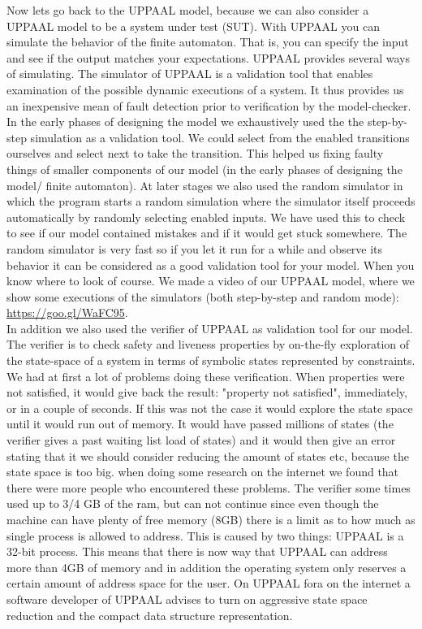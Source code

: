 Now lets go back to the UPPAAL model, because we can also consider a UPPAAL model to be a system under test (SUT). With UPPAAL you can simulate the behavior of the finite automaton. That is, you can specify the input and see if the output matches your expectations. UPPAAL provides several ways of simulating. The simulator of UPPAAL is a validation tool that enables examination of the possible dynamic executions of a system. It thus provides us an inexpensive mean of fault detection prior to verification by the model-checker. In the early phases of designing the model we exhaustively used the the step-by-step simulation as a validation tool. We could select from the enabled transitions ourselves and select next to take the transition. This helped us fixing faulty things of smaller components of our model (in the early phases of designing the model/ finite automaton). At later stages we also used the random simulator in which the program starts a random  simulation where the simulator itself proceeds automatically by randomly selecting enabled inputs. We have used this to check to see if our model contained mistakes and if it would get stuck somewhere. The random simulator is very fast so if you let it run for a while and observe its behavior it can be considered as a good validation tool for your model. When you know where to look of course. We made a video of our UPPAAL model, where we show some executions of the simulators (both step-by-step and random mode): \href{https://goo.gl/WaFC95}{https://goo.gl/WaFC95}. \\

In addition we also used the verifier of UPPAAL as validation tool for our model. The verifier is to check safety and liveness properties by on-the-fly exploration of the state-space of a system in terms of symbolic states represented by constraints. We had at first a lot of problems doing these verification. When properties were not satisfied, it would give back the result: "property not satisfied", immediately, or in a couple of seconds. If this was not the case it would explore the state space until it would run out of memory. It would have passed millions of states (the verifier gives a past waiting list load of states) and it would then give an error stating that it we should consider reducing the amount of states etc, because the state space is too big. when doing some research on the internet we found that there were more people who encountered these problems. The verifier some times used up to 3/4 GB of the ram, but can not continue since even though the machine can have plenty of free memory (8GB) there is a limit as to how much as single process is allowed to address. This is caused by two things: UPPAAL is a 32-bit process. This means that there is now way that UPPAAL can address more than 4GB of memory and in addition the operating system only reserves a certain amount of address space for the user. On UPPAAL fora on the internet a software developer of UPPAAL advises to turn on aggressive state space reduction and the compact data structure representation. \newpage

